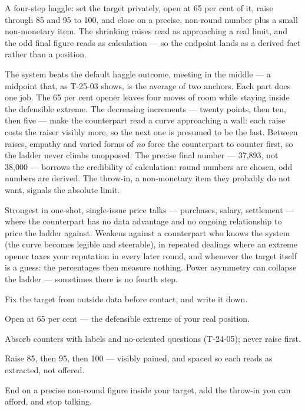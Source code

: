 \begin{core}
A four-step haggle: set the target privately, open at 65 per cent of it, raise through 85 and 95 to 100, and close on a precise, non-round number plus a small non-monetary item. The shrinking raises read as approaching a real limit, and the odd final figure reads as calculation --- so the endpoint lands as a derived fact rather than a position.
\end{core}
\begin{mechanism}
The system beats the default haggle outcome, meeting in the middle --- a midpoint that, as T-25-03 shows, is the average of two anchors. Each part does one job. The 65 per cent opener leaves four moves of room while staying inside the defensible extreme. The decreasing increments --- twenty points, then ten, then five --- make the counterpart read a curve approaching a wall: each raise costs the raiser visibly more, so the next one is presumed to be the last. Between raises, empathy and varied forms of \emph{no} force the counterpart to counter first, so the ladder never climbs unopposed. The precise final number --- 37,893, not 38,000 --- borrows the credibility of calculation: round numbers are chosen, odd numbers are derived. The throw-in, a non-monetary item they probably do not want, signals the absolute limit.
\end{mechanism}
\begin{conditions}
Strongest in one-shot, single-issue price talks --- purchases, salary, settlement --- where the counterpart has no data advantage and no ongoing relationship to price the ladder against. Weakens against a counterpart who knows the system (the curve becomes legible and steerable), in repeated dealings where an extreme opener taxes your reputation in every later round, and whenever the target itself is a guess: the percentages then measure nothing. Power asymmetry can collapse the ladder --- sometimes there is no fourth step.
\end{conditions}
\begin{application}
  \item Fix the target from outside data before contact, and write it down.
  \item Open at 65 per cent --- the defensible extreme of your real position.
  \item Absorb counters with labels and no-oriented questions (T-24-05); never raise first.
  \item Raise 85, then 95, then 100 --- visibly pained, and spaced so each reads as extracted, not offered.
  \item End on a precise non-round figure inside your target, add the throw-in you can afford, and stop talking.
\end{application}
